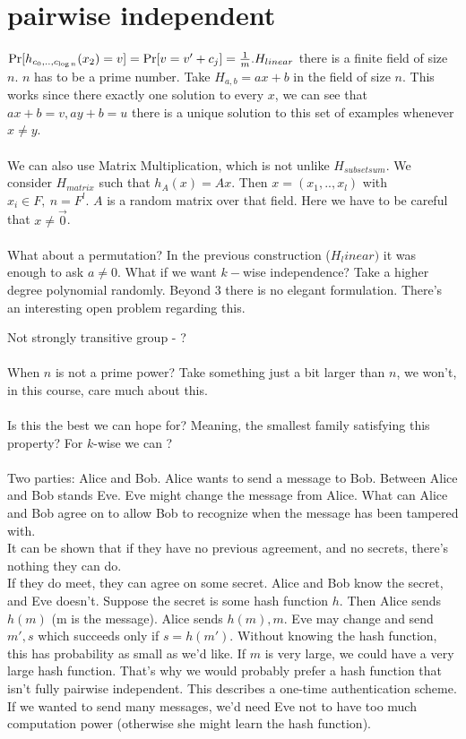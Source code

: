 \documentclass{article}
\begin{document}
\section{pairwise independent}
$\Pr[h_{c_0,..,c_{\log n}}(x_2)=v]=\Pr[v=v'+c_j]=\frac{1}{m}.\\
H_{linear}$ there is a finite field of size $n$. $n$ has to be a prime number. Take $H_{a,b}=ax+b$ in the field of size $n$. This works since there exactly one solution to every $x$, we can see that $ax+b=v, ay+b=u$ there is a unique solution to this set of examples whenever $x\ne y$. \\\\
We can also use Matrix Multiplication, which is not unlike $H_{subsetsum}$. We consider $H_{matrix}$ such that $h_A(x)=Ax$. Then $x=(x_1,..,x_l)$ with $x_i\in F, \ n=F^l$. $A$ is a random matrix over that field. Here we have to be careful that $x\ne \vec 0$. \\\\
What about a permutation? In the previous construction ($H_linear)$ it was enough to ask $a\ne 0$. What if we want $k-$wise independence? Take a higher degree polynomial randomly. Beyond 3 there is no elegant formulation. There's an interesting open problem regarding this.

Not strongly transitive group - ? \\\\
When  $n$ is not a prime power? Take something just a bit larger than $n$, we won't, in this course, care much about this.\\\\
Is this the best we can hope for? Meaning, the smallest family satisfying this property? For $k$-wise we can ?\\\\

Two parties: Alice and Bob. Alice wants to send a message to Bob. Between Alice and Bob stands Eve. Eve might change the message from Alice. What can Alice and Bob agree on to allow Bob to recognize when the message has been tampered with. \\
It can be shown that if they have no previous agreement, and no secrets, there's nothing they can do.\\
If they do meet, they can agree on some secret. Alice and Bob know the secret, and Eve doesn't. 
Suppose the secret is some hash function $h$. Then Alice sends $h(m)$ (m is the message). Alice sends $h(m), m$. Eve may change and send $m',s$ which succeeds only if $s=h(m').$ Without knowing the hash function, this has probability as small as we'd like. If $m$ is very large, we could have a very large hash function. That's why we would probably prefer a hash function that isn't fully pairwise independent. This describes a one-time authentication scheme. If we wanted to send many messages, we'd need Eve not to have too much computation power (otherwise she might learn the hash function). \\\\
\end{document}
